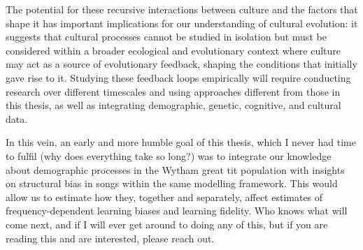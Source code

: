 The potential for these recursive interactions between culture and the factors that shape it has important implications for our understanding of cultural evolution: it suggests that cultural processes cannot be studied in isolation but must be considered within a broader ecological and evolutionary context where culture may act as a source of evolutionary feedback, shaping the conditions that initially gave rise to it. Studying these feedback loops empirically will require conducting research over different timescales and using approaches different from those in this thesis, as well as integrating demographic, genetic, cognitive, and cultural data.

In this vein, an early and more humble goal of this thesis, which I never had time to fulfil (why does everything take so long?) was to integrate our knowledge about demographic processes in the Wytham great tit population with insights on structural bias in songs within the same modelling framework. This would allow us to estimate how they, together and separately, affect estimates of frequency-dependent learning biases and learning fidelity. Who knows what will come next, and if I will ever get around to doing any of this, but if you are reading this and are interested, please reach out.\\

\centering
\hspace{-.23cm}
\centering




